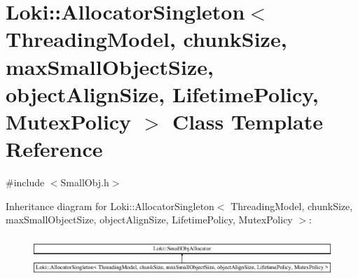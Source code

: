 \hypertarget{classLoki_1_1AllocatorSingleton}{}\section{Loki\+:\+:Allocator\+Singleton$<$ Threading\+Model, chunk\+Size, max\+Small\+Object\+Size, object\+Align\+Size, Lifetime\+Policy, Mutex\+Policy $>$ Class Template Reference}
\label{classLoki_1_1AllocatorSingleton}


{\ttfamily \#include $<$Small\+Obj.\+h$>$}

Inheritance diagram for Loki\+:\+:Allocator\+Singleton$<$ Threading\+Model, chunk\+Size, max\+Small\+Object\+Size, object\+Align\+Size, Lifetime\+Policy, Mutex\+Policy $>$\+:\begin{figure}[H]
\begin{center}
\leavevmode
\includegraphics[height=1.559888cm]{classLoki_1_1AllocatorSingleton}
\end{center}
\end{figure}
